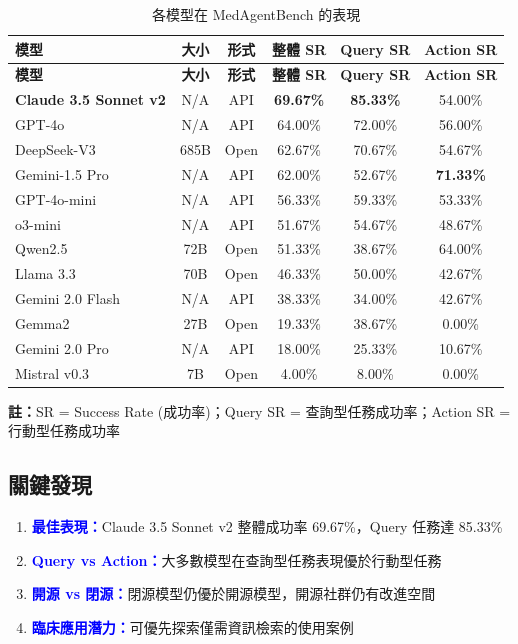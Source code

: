 \documentclass[12pt,a4paper]{article}
\begin{document}
\begin{longtable}{p{4cm}ccccc}
\caption{各模型在 MedAgentBench 的表現} \\
\toprule
\textbf{模型} & \textbf{大小} & \textbf{形式} & \textbf{整體 SR} & \textbf{Query SR} & \textbf{Action SR} \\
\midrule
\endfirsthead

\toprule
\textbf{模型} & \textbf{大小} & \textbf{形式} & \textbf{整體 SR} & \textbf{Query SR} & \textbf{Action SR} \\
\midrule
\endhead

\bottomrule
\endfoot

\textbf{Claude 3.5 Sonnet v2} & N/A & API & \textbf{69.67\%} & \textbf{85.33\%} & 54.00\% \\
GPT-4o & N/A & API & 64.00\% & 72.00\% & 56.00\% \\
DeepSeek-V3 & 685B & Open & 62.67\% & 70.67\% & 54.67\% \\
Gemini-1.5 Pro & N/A & API & 62.00\% & 52.67\% & \textbf{71.33\%} \\
GPT-4o-mini & N/A & API & 56.33\% & 59.33\% & 53.33\% \\
o3-mini & N/A & API & 51.67\% & 54.67\% & 48.67\% \\
Qwen2.5 & 72B & Open & 51.33\% & 38.67\% & 64.00\% \\
Llama 3.3 & 70B & Open & 46.33\% & 50.00\% & 42.67\% \\
Gemini 2.0 Flash & N/A & API & 38.33\% & 34.00\% & 42.67\% \\
Gemma2 & 27B & Open & 19.33\% & 38.67\% & 0.00\% \\
Gemini 2.0 Pro & N/A & API & 18.00\% & 25.33\% & 10.67\% \\
Mistral v0.3 & 7B & Open & 4.00\% & 8.00\% & 0.00\% \\
\bottomrule
\end{longtable}

\textbf{註：}SR = Success Rate (成功率)；Query SR = 查詢型任務成功率；Action SR = 行動型任務成功率

\subsection{關鍵發現}

\begin{enumerate}
    \item \textcolor{blue}{\textbf{最佳表現：}}Claude 3.5 Sonnet v2 整體成功率 69.67\%，Query 任務達 85.33\%
    \item \textcolor{blue}{\textbf{Query vs Action：}}大多數模型在查詢型任務表現優於行動型任務
    \item \textcolor{blue}{\textbf{開源 vs 閉源：}}閉源模型仍優於開源模型，開源社群仍有改進空間
    \item \textcolor{blue}{\textbf{臨床應用潛力：}}可優先探索僅需資訊檢索的使用案例
\end{enumerate}
\end{document}
